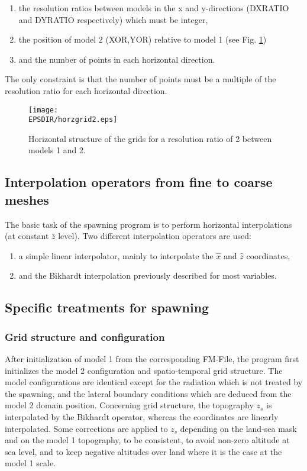 \begin{enumerate}
\item the resolution ratios between models in the x and y-directions
(DXRATIO and DYRATIO respectively) which must be integer,
\item the position of model 2 (XOR,YOR) relative to model 1
(see Fig. \ref{grid-conf})
\item and the number of points in each horizontal direction.
\end{enumerate}

\noindent The only constraint is that the number of points must be a multiple of the
resolution ratio for each horizontal direction.

\begin{figure}
\centerline{\texttt{[image: \\EPSDIR/horzgrid2.eps]}}
\caption{Horizontal structure of the grids for a resolution ratio of 2
between models 1 and 2.}
\label{grid-conf}
\end{figure}

\subsection{Interpolation operators from fine to coarse meshes}

 The basic task of the spawning program is to perform horizontal interpolations
(at constant $\bar{z}$ level). Two different interpolation operators are used:

\begin{enumerate}
\item a simple linear interpolator, mainly to interpolate the
$\widehat{x}$ and $\widehat{z}$ coordinates,
\item and the Bikhardt interpolation previously described for most variables.
\end{enumerate}

\subsection{Specific treatments for spawning}

\subsubsection{Grid structure and configuration}

 After initialization of model 1 from the corresponding FM-File,
the program first initializes the model 2 configuration and spatio-temporal
grid structure. The model configurations are identical except for the
radiation which is not treated by the spawning, and the lateral boundary
conditions which are deduced from the model 2 domain position.
Concerning grid structure, the topography $z_s$ is interpolated by the Bikhardt
operator, whereas the coordinates are linearly interpolated.
Some corrections are applied to $z_s$ depending on the land-sea mask and on
the model 1 topography, to be consistent, to avoid non-zero altitude at
sea level, and to keep negative altitudes over land where it is the case at
the model 1 scale.

